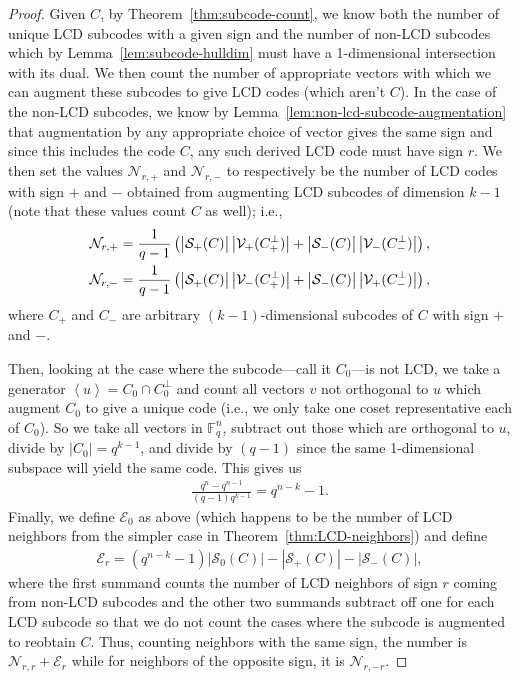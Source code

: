 \documentclass[11pt]{article}
\theoremstyle{definition}
\newcommand{\F}{\mathbb{F}}
\newcommand{\Abs}[1]{\left|#1\right|}
\newcommand{\Ang}[1]{\left\langle#1\right\rangle}
\newcommand{\CurE}{\mathcal{E}}
\newcommand{\CurN}{\mathcal{N}}
\newcommand{\CurS}{\mathcal{S}}
\newcommand{\CurV}{\mathcal{V}}
\begin{document}
\begin{proof}
	Given $C$, by Theorem~\ref{thm:subcode-count}, we know both the number of unique LCD subcodes with a given sign and the number of non-LCD subcodes which by Lemma~\ref{lem:subcode-hulldim} must have a 1-dimensional intersection with its dual.
	We then count the number of appropriate vectors with which we can augment these subcodes to give LCD codes (which aren't $C$).
	In the case of the non-LCD subcodes, we know by Lemma~\ref{lem:non-lcd-subcode-augmentation} that augmentation by any appropriate choice of vector gives the same sign and since this includes the code $C$, any such derived LCD code must have sign $r$.
	We then set the values $\CurN_{r, +}$ and $\CurN_{r, -}$ to respectively be the number of LCD codes with sign $+$ and $-$ obtained from augmenting LCD subcodes of dimension $k - 1$ (note that these values count $C$ as well); i.e., 
	\begin{align*}
		\CurN_{r, +}
		= \frac{1}{q - 1} \left(
			\Abs{\CurS_+(C) \vphantom{\CurV_+(C_+^\bot)}} \Abs{\CurV_+(C_+^\bot)} +
			\Abs{\CurS_-(C) \vphantom{\CurV_-(C_-^\bot)}} \Abs{\CurV_-(C_-^\bot)}
		\right), \\
		\CurN_{r, -}
		= \frac{1}{q - 1} \left(
			\Abs{\CurS_+(C) \vphantom{\CurV_-(C_+^\bot)}} \Abs{\CurV_-(C_+^\bot)} +
			\Abs{\CurS_-(C) \vphantom{\CurV_+(C_-^\bot)}} \Abs{\CurV_+(C_-^\bot)}
		\right),
	\end{align*}
	where $C_+$ and $C_-$ are arbitrary $(k - 1)$-dimensional subcodes of $C$ with sign $+$ and $-$.

	Then, looking at the case where the subcode---call it $C_0$---is not LCD, we take a generator $\Ang{u} = C_0 \cap C_0^\bot$ and count all vectors $v$ not orthogonal to $u$ which augment $C_0$ to give a unique code (i.e., we only take one coset representative each of $C_0$).
	So we take all vectors in $\F_q^n$, subtract out those which are orthogonal to $u$, divide by $\Abs{C_0} = q^{k - 1}$, and divide by $(q - 1)$ since the same 1-dimensional subspace will yield the same code.
	This gives us
	\begin{align*}
		\frac{q^n - q^{n - 1}}{(q - 1) q^{k - 1}} = q^{n - k} - 1.
	\end{align*}
	Finally, we define $\CurE_0$ as above (which happens to be the number of LCD neighbors from the simpler case in Theorem~\ref{thm:LCD-neighbors}) and define
	\begin{align*}
		\CurE_r = (q^{n - k} - 1) \Abs{\CurS_0(C)} - \Abs{\CurS_+(C)} - \Abs{\CurS_-(C)},
	\end{align*}
	where the first summand counts the number of LCD neighbors of sign $r$ coming from non-LCD subcodes and the other two summands subtract off one for each LCD subcode so that we do not count the cases where the subcode is augmented to reobtain $C$.
	Thus, counting neighbors with the same sign, the number is $\CurN_{r, r} + \CurE_r$ while for neighbors of the opposite sign, it is $\CurN_{r, -r}$.
\end{proof}
\end{document}
